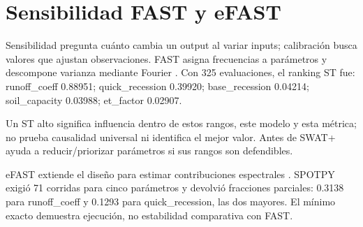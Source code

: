 \chapter{Sensibilidad FAST y eFAST}
Sensibilidad pregunta cuánto cambia un output al variar inputs; calibración busca valores que ajustan observaciones. FAST asigna frecuencias a parámetros y descompone varianza mediante Fourier \citep{cukier1973fast}. Con 325 evaluaciones, el ranking ST fue: runoff\_coeff 0.88951; quick\_recession 0.39920; base\_recession 0.04214; soil\_capacity 0.03988; et\_factor 0.02907.

Un ST alto significa influencia dentro de estos rangos, este modelo y esta métrica; no prueba causalidad universal ni identifica el mejor valor. Antes de SWAT+ ayuda a reducir/priorizar parámetros si sus rangos son defendibles.

eFAST extiende el diseño para estimar contribuciones espectrales \citep{saltelli1999efast}. SPOTPY exigió 71 corridas para cinco parámetros y devolvió fracciones parciales: 0.3138 para runoff\_coeff y 0.1293 para quick\_recession, las dos mayores. El mínimo exacto demuestra ejecución, no estabilidad comparativa con FAST.

